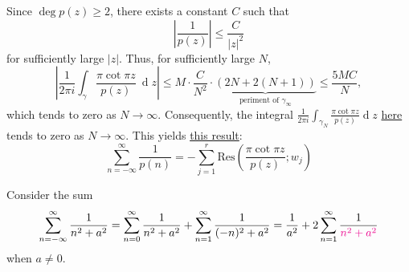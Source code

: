 \documentclass[12pt]{article}
\renewcommand{\d}{\ensuremath{\operatorname{d}}}
\begin{document}
Since $\deg p(z)\geq2$, there exists a constant $C$ such that
$$\left|\frac{1}{p(z)}\right|\leq\frac{C}{|z|^{2}}$$
for sufficiently large $|z|$. Thus, for sufficiently large $N$,
$$\left|\frac{1}{2\pi i}\int_{\gamma}\frac{\pi\cot\pi z}{p(z)}\ \d z\right|\leq M\cdot\frac{C}{N^{2}}\cdot\underbrace{(2N+2(N+1))}_{\text{periment of $\gamma_{\infty}$}}\leq\frac{5MC}{N},$$
which tends to zero as $N\to\infty$. Consequently, the integral ${\frac{1}{2\pi i}}\int_{\gamma_{N}}{\frac{\pi\cot\pi z}{p(z)}}\d z$ \hyperlink{cotangent-integral}{here} tends to zero as $N\to\infty$. This yields \hyperlink{integral-of-1-over-pn}{this result}:\[\sum_{n=-\infty}^{\infty}{\frac{1}{p(n)}}=-\sum_{j=1}^{r}\mathrm{Res}\left({\frac{\pi\cot\pi z}{p(z)}};w_{j}\right)\]

\eg Consider the sum \[\sum_{n=-\infty}^{\infty}\frac{1}{n^2+a^2} = \sum_{n=0}^{\infty}\frac{1}{n^2+a^2}+\sum_{n=1}^{\infty}\frac{1}{(-n)^2+a^2}= \frac{1}{a^2} +2\sum_{n=1}^{\infty}\frac{1}{\textcolor{magenta}{n^2+a^2}}\] when $a\neq 0$.
\end{document}
